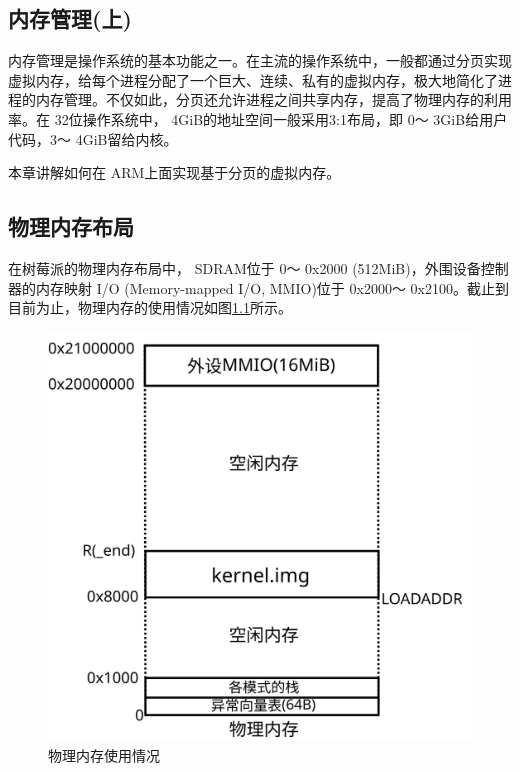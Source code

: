 \documentclass[main.tex]{subfiles}
\begin{document}
\ifxetex\else\begin{CJK*}{UTF8}{song}\fi

\chapter{内存管理(上)}
内存管理是操作系统的基本功能之一。在主流的操作系统中，一般都通过分页实现虚拟内存，给每个进程分配了一个巨大、连续、私有的虚拟内存，极大地简化了进程的内存管理。不仅如此，分页还允许进程之间共享内存，提高了物理内存的利用率。在 32位操作系统中， 4GiB的地址空间一般采用3\-:\-1布局，即 0～ 3\-GiB给用户代码，3～ 4\-GiB留给内核。

\par
本章讲解如何在 ARM上面实现基于分页的虚拟内存。

\section{物理内存布局}
在树莓派的物理内存布局中， SDRAM位于 0～ 0x2000 (512\-MiB)，外围设备控制器的内存映射 I/O (Memory\--\-mapped I/O, MMIO)位于 0x2000～ 0x2100。截止到目前为止，物理内存的使用情况如图\ref{figure:4-1}所示。

\begin{figure}[htp]
\centering
\includegraphics[scale=0.4]{figures/4-1}
\caption{物理内存使用情况}
\label{figure:4-1}
\end{figure}


\end{CJK*}
\end{document}
